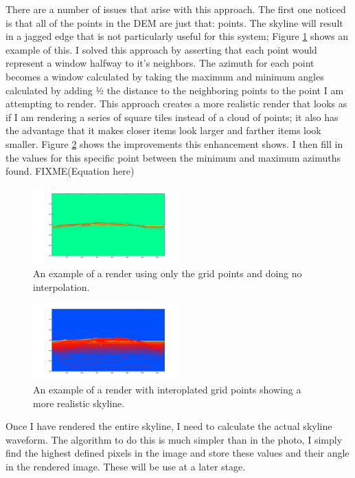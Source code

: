 \documentclass{acm_proc_article-sp}
\begin{document}
There are a number of issues that arise with this approach.  The first one noticed is that all of the points in the DEM are just that: points.  The skyline will result in a jagged edge that is not particularly useful for this system; Figure \ref{fig:tetPoints} shows an example of this.  I solved this approach by asserting that each point would represent a window halfway to it’s neighbors.  The azimuth for each point becomes a window calculated by taking the maximum and minimum angles calculated by adding ½ the distance to the neighboring points to the point I am attempting to render.  This approach creates a more realistic render that looks as if I am rendering a series of square tiles instead of a cloud of points; it also has the advantage that it makes closer items look larger and farther items look smaller. Figure \ref{fig:tetGood} shows the improvements this enhancement shows.  I then fill in the values for this specific point between the minimum and maximum azimuths found. FIXME(Equation here)
\begin{figure}
	\centering
	\includegraphics[width=0.5\textwidth]{tetonsRenderPoints.png}
	\caption{An example of a render using only the grid points and doing no interpolation.}
	\label{fig:tetPoints}
\end{figure}
\begin{figure}
	\centering
	\includegraphics[width=0.5\textwidth]{uncleaned_render_of_tetons.png}
	\caption{An example of a render with interoplated grid points showing a more realistic skyline.}
	\label{fig:tetGood}
\end{figure}
    Once I have rendered the entire skyline, I need to calculate the actual skyline waveform.  The algorithm to do this is much simpler than in the photo, I simply find the highest defined pixels in the image and store these values and their angle in the rendered image. These will be use at a later stage.
\end{document}
